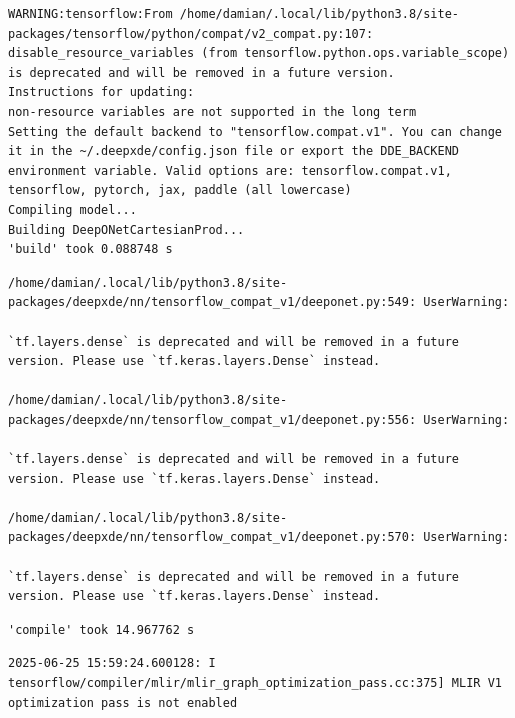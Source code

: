 \documentclass[
  spanish,
  us-letterpaper,
  DIV=11,
  numbers=noendperiod]{scrreprt}
\theoremstyle{definition}
\theoremstyle{plain}
\theoremstyle{remark}
\begin{document}
\begin{verbatim}
WARNING:tensorflow:From /home/damian/.local/lib/python3.8/site-packages/tensorflow/python/compat/v2_compat.py:107: disable_resource_variables (from tensorflow.python.ops.variable_scope) is deprecated and will be removed in a future version.
Instructions for updating:
non-resource variables are not supported in the long term
Setting the default backend to "tensorflow.compat.v1". You can change it in the ~/.deepxde/config.json file or export the DDE_BACKEND environment variable. Valid options are: tensorflow.compat.v1, tensorflow, pytorch, jax, paddle (all lowercase)
Compiling model...
Building DeepONetCartesianProd...
'build' took 0.088748 s
\end{verbatim}

\begin{verbatim}
/home/damian/.local/lib/python3.8/site-packages/deepxde/nn/tensorflow_compat_v1/deeponet.py:549: UserWarning:

`tf.layers.dense` is deprecated and will be removed in a future version. Please use `tf.keras.layers.Dense` instead.

/home/damian/.local/lib/python3.8/site-packages/deepxde/nn/tensorflow_compat_v1/deeponet.py:556: UserWarning:

`tf.layers.dense` is deprecated and will be removed in a future version. Please use `tf.keras.layers.Dense` instead.

/home/damian/.local/lib/python3.8/site-packages/deepxde/nn/tensorflow_compat_v1/deeponet.py:570: UserWarning:

`tf.layers.dense` is deprecated and will be removed in a future version. Please use `tf.keras.layers.Dense` instead.
\end{verbatim}

\begin{verbatim}
'compile' took 14.967762 s
\end{verbatim}

\begin{verbatim}
2025-06-25 15:59:24.600128: I tensorflow/compiler/mlir/mlir_graph_optimization_pass.cc:375] MLIR V1 optimization pass is not enabled
\end{verbatim}
\end{document}
